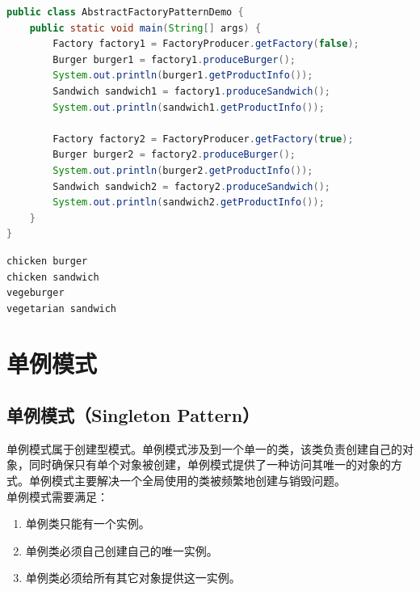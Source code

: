 \begin{lstlisting}[language=Java, title=AbstractFactoryPatternDemo.java]
public class AbstractFactoryPatternDemo {
    public static void main(String[] args) {
        Factory factory1 = FactoryProducer.getFactory(false);
        Burger burger1 = factory1.produceBurger();
        System.out.println(burger1.getProductInfo());
        Sandwich sandwich1 = factory1.produceSandwich();
        System.out.println(sandwich1.getProductInfo());

        Factory factory2 = FactoryProducer.getFactory(true);
        Burger burger2 = factory2.produceBurger();
        System.out.println(burger2.getProductInfo());
        Sandwich sandwich2 = factory2.produceSandwich();
        System.out.println(sandwich2.getProductInfo());
    }
} 
\end{lstlisting}

\begin{tcolorbox}
    \begin{verbatim}
chicken burger
chicken sandwich
vegeburger
vegetarian sandwich
\end{verbatim}
\end{tcolorbox}

\newpage

\section{单例模式}

\subsection{单例模式（Singleton Pattern）}

单例模式属于创建型模式。单例模式涉及到一个单一的类，该类负责创建自己的对象，同时确保只有单个对象被创建，单例模式提供了一种访问其唯一的对象的方式。单例模式主要解决一个全局使用的类被频繁地创建与销毁问题。\\

单例模式需要满足：

\begin{enumerate}
    \item 单例类只能有一个实例。
    \item 单例类必须自己创建自己的唯一实例。
    \item 单例类必须给所有其它对象提供这一实例。
\end{enumerate}

